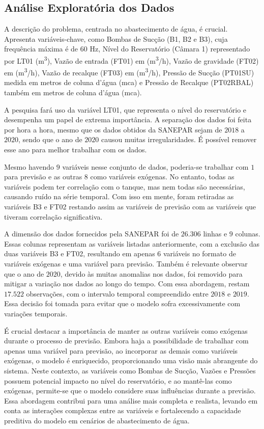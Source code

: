 \subsection{An\'alise Explorat\'oria dos Dados}


A descrição do problema, centrada no abastecimento de água, é crucial. Apresenta variáveis-chave, como Bombas de Sucção (B1, B2 e B3), cuja frequência máxima é de $60$ Hz, Nível do Reservatório (Câmara 1) representado por LT01 (\si{m^3}), Vazão de entrada (FT01) em (\si{m^3/h}), Vazão de gravidade (FT02) em (\si{m^3/h}), Vazão de recalque (FT03) em (\si{m^3/h}), Pressão de Sucção (PT01SU) medida em metros de coluna d'água (\si{mca}) e Pressão de Recalque (PT02RBAL) também em metros de coluna d'água (\si{mca}).

A pesquisa fará uso da variável LT01, que representa o nível do reservatório e desempenha um papel de extrema importância. A separação dos dados foi feita por hora a hora, mesmo que os dados obtidos da SANEPAR sejam de $2018$ a $2020$, sendo que o ano de $2020$ causou muitas irregularidades. É possível remover esse ano para melhor trabalhar com os dados.

Mesmo havendo $9$ variáveis nesse conjunto de dados, poderia-se trabalhar com $1$ para previsão e as outras 8 como variáveis exógenas. No entanto, todas as variáveis podem ter correlação com o tanque, mas nem todas são necessárias, causando ruído na série temporal. Com isso em mente, foram retiradas as variáveis B3 e FT02 restando assim as variáveis de previsão com as variáveis que tiveram correlação significativa.

A dimensão dos dados fornecidos pela SANEPAR foi de $26.306$ linhas e $9$ colunas. Essas colunas representam as variáveis listadas anteriormente, com a exclusão das duas variáveis B3 e FT02, resultando em apenas 6 variáveis no formato de variáveis exógenas e uma variável para previsão. Também é relevante observar que o ano de $2020$, devido às muitas anomalias nos dados, foi removido para mitigar a variação nos dados ao longo do tempo. Com essa abordagem, restam $17.522$ observações, com o intervalo temporal compreendido entre $2018$ e $2019$. Essa decisão foi tomada para evitar que o modelo sofra excessivamente com variações temporais.

É crucial destacar a importância de manter as outras variáveis como exógenas durante o processo de previsão. Embora haja a possibilidade de trabalhar com apenas uma variável para previsão, ao incorporar as demais como variáveis exógenas, o modelo é enriquecido, proporcionando uma visão mais abrangente do sistema. Neste contexto, as variáveis como Bombas de Sucção, Vazões e Pressões possuem potencial impacto no nível do reservatório, e ao mantê-las como exógenas, permite-se que o modelo considere suas influências durante a previsão. Essa abordagem contribui para uma análise mais completa e realista, levando em conta as interações complexas entre as variáveis e fortalecendo a capacidade preditiva do modelo em cenários de abastecimento de água.

